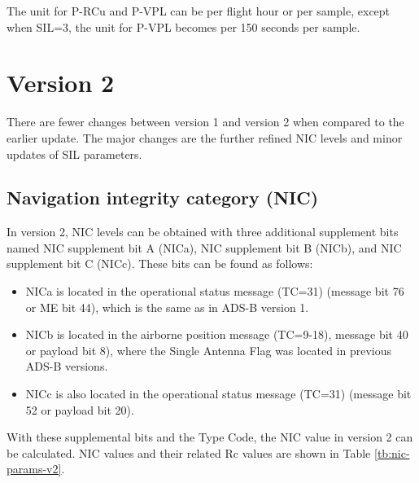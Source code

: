 The unit for P-RCu and P-VPL can be per flight hour or per
sample, except when SIL=3, the unit for P-VPL becomes per 150 seconds per sample.



\section{Version 2}

There are fewer changes between version 1 and version 2 when compared to the earlier update. The major changes are the further refined NIC levels and minor updates of SIL parameters.

\subsection{Navigation integrity category (NIC)}

In version 2, NIC levels can be obtained with three additional supplement bits named NIC supplement bit A (NICa), NIC supplement bit B (NICb), and NIC supplement bit C (NICc). These bits can be found as follows:


\begin{itemize}
  \item NICa is located in the operational status message (TC=31) (message bit 76 or ME bit 44), which is the same as in ADS-B version 1.
  \item NICb is located in the airborne position message (TC=9-18), message bit 40 or payload bit 8), where the Single Antenna Flag was located in previous ADS-B versions.
  \item NICc is also located in the operational status message (TC=31) (message bit 52 or payload bit 20).
\end{itemize}

With these supplemental bits and the Type Code, the NIC value in version 2 can be calculated. NIC values and their related Rc values are shown in Table \ref{tb:nic-params-v2}.


